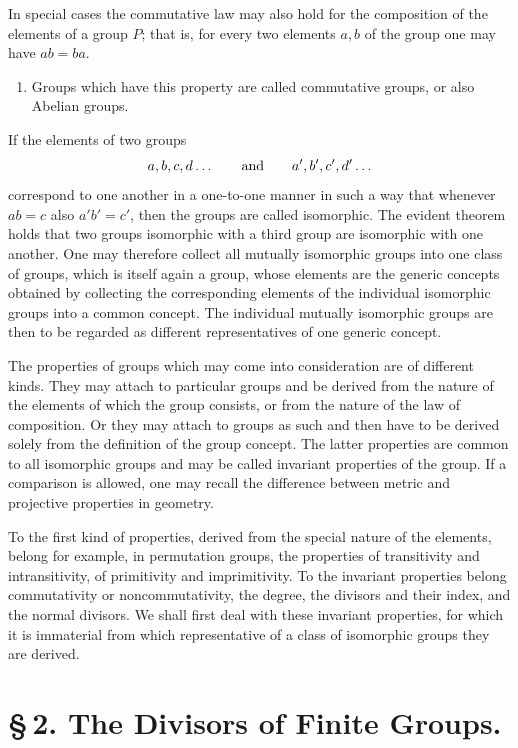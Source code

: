 \documentclass[11pt]{article}
\begin{document}
In special cases the commutative law may also hold for the composition of the elements of a group $P$; that is, for every two elements $a,b$ of the group one may have $ab=ba$.

\begin{enumerate}[resume,label=\arabic*.]
\item Groups which have this property are called commutative groups, or also Abelian groups.
\end{enumerate}

If the elements of two groups
\[
a,b,c,d\ldots \qquad\hbox{and}\qquad a',b',c',d'\ldots
\]
correspond to one another in a one-to-one manner in such a way that whenever $ab=c$ also $a'b'=c'$, then the groups are called isomorphic. The evident theorem holds that two groups isomorphic with a third group are isomorphic with one another. One may therefore collect all mutually isomorphic groups into one class of groups, which is itself again a group, whose elements are the generic concepts obtained by collecting the corresponding elements of the individual isomorphic groups into a common concept. The individual mutually isomorphic groups are then to be regarded as different representatives of one generic concept.

The properties of groups which may come into consideration are of different kinds. They may attach to particular groups and be derived from the nature of the elements of which the group consists, or from the nature of the law of composition. Or they may attach to groups as such and then have to be derived solely from the definition of the group concept. The latter properties are common to all isomorphic groups and may be called invariant properties of the group. If a comparison is allowed, one may recall the difference between metric and projective properties in geometry.

To the first kind of properties, derived from the special nature of the elements, belong for example, in permutation groups, the properties of transitivity and intransitivity, of primitivity and imprimitivity. To the invariant properties belong commutativity or noncommutativity, the degree, the divisors and their index, and the normal divisors. We shall first deal with these invariant properties, for which it is immaterial from which representative of a class of isomorphic groups they are derived.

\section*{\S\,2. The Divisors of Finite Groups.}
\end{document}
